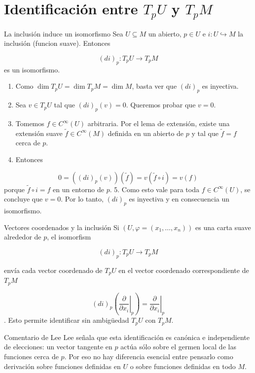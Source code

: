 \section{Identificación entre $T_pU$ y $T_pM$}
\begin{bookproposition}{La inclusión induce un isomorfismo}
Sea $U\subseteq M$ un abierto, $p\in U$ e $i:U\hookrightarrow M$ la inclusión (funcion suave). Entonces

\[
(di)_p:T_pU\to T_pM
\]
es un isomorfismo.

\end{bookproposition}
\begin{bookproof}{}
\begin{enumerate}
\item Como $\dim T_pU=\dim T_pM=\dim M$, basta ver que $(di)_p$ es inyectiva.
\item Sea $v\in T_pU$ tal que $(di)_p(v)=0$. Queremos probar que $v=0$.
\item Tomemos $f\in C^\infty(U)$ arbitraria. Por el lema de extensión, existe una extensión suave $\widetilde f\in C^\infty(M)$ definida en un abierto de $p$ y tal que $\widetilde f=f$ cerca de $p$.
\item Entonces
\end{enumerate}
\[
0=((di)_p(v))( \widetilde f )=v(\widetilde f\circ i)=v(f)
\]
porque $\widetilde f\circ i=f$ en un entorno de $p$. 5. Como esto vale para toda $f\in C^\infty(U)$, se concluye que $v=0$. Por lo tanto, $(di)_p$ es inyectiva y en consecuencia un isomorfismo.

\bookqed
\end{bookproof}
\begin{bookremark}{Vectores coordenados y la inclusión}
Si $(U,\varphi=(x_1,\dots,x_n))$ es una carta suave alrededor de $p$, el isomorfism

\[
(di)_p:T_pU\to T_pM
\]
\end{bookremark}
envía cada vector coordenado de $T_pU$ en el vector coordenado correspondiente de $T_pM$

\[
(di)_p\left(\left.\frac{\partial}{\partial x_i}\right|_p\right)=\left.\frac{\partial}{\partial x_i}\right|_p
\]
. Esto permite identificar sin ambigüedad $T_pU$ con $T_pM$.

\begin{bookremark}{Comentario de Lee}
Lee señala que esta identificación es canónica e independiente de elecciones: un vector tangente en $p$ actúa sólo sobre el germen local de las funciones cerca de $p$. Por eso no hay diferencia esencial entre pensarlo como derivación sobre funciones definidas en $U$ o sobre funciones definidas en todo $M$.

\end{bookremark}
